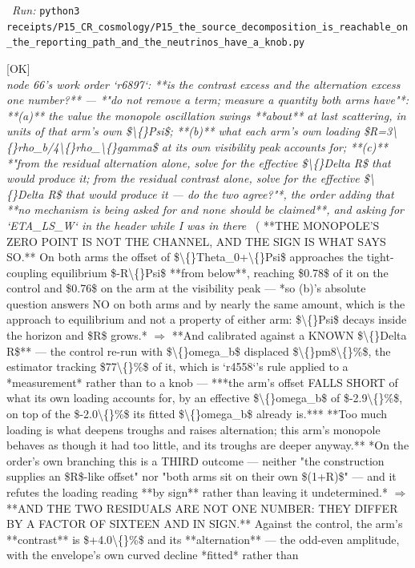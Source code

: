 \begin{description}
\ \emph{Run:} \texttt{python3 receipts/P15\_CR\_cosmology/P15\_the\_source\_decomposition\_is\_reachable\_on\_the\_reporting\_path\_and\_the\_neutrinos\_have\_a\_knob.py}
\item[\rcptlabel{P15_the_monopole_zero_point_is_not_the_channel_and_the_two_residuals_point_opposite_ways}{P15R177}\textbf{P15R177}\quad\texttt{P15\_the\_monopole\_zero\_point\_is\_not\_the\_channel\_and\_the\_two\_residuals\_point\_opposite\_ways}]\hfill\textsf{[OK]}\\
\textit{node 66's work order `r6897`: **is the contrast excess and the alternation excess one number?** --- *"do not remove a term; measure a quantity both arms have"*: **(a)** the value the monopole oscillation swings **about** at last scattering, in units of that arm's own \$\textbackslash\{\}Psi\$; **(b)** what each arm's own loading \$R=3\textbackslash\{\}rho\_b/4\textbackslash\{\}rho\_\textbackslash\{\}gamma\$ at its own visibility peak accounts for; **(c)** *"from the residual alternation alone, solve for the effective \$\textbackslash\{\}Delta R\$ that would produce it; from the residual contrast alone, solve for the effective \$\textbackslash\{\}Delta R\$ that would produce it --- do the two agree?"*, the order adding that **no mechanism is being asked for and none should be claimed**, and asking for `ETA\_LS\_W` in the header while I was in there} \ ( **THE MONOPOLE'S ZERO POINT IS NOT THE CHANNEL, AND THE SIGN IS WHAT SAYS SO.** On both arms the offset of \$\textbackslash\{\}Theta\_0+\textbackslash\{\}Psi\$ approaches the tight-coupling equilibrium \$-R\textbackslash\{\}Psi\$ **from below**, reaching \$0.78\$ of it on the control and \$0.76\$ on the arm at the visibility peak --- *so (b)'s absolute question answers NO on both arms and by nearly the same amount, which is the approach to equilibrium and not a property of either arm: \$\textbackslash\{\}Psi\$ decays inside the horizon and \$R\$ grows.* \ensuremath{\Rightarrow} **And calibrated against a KNOWN \$\textbackslash\{\}Delta R\$** --- the control re-run with \$\textbackslash\{\}omega\_b\$ displaced \$\textbackslash\{\}pm8\textbackslash\{\}\%\$, the estimator tracking \$77\textbackslash\{\}\%\$ of it, which is `r4558`'s rule applied to a *measurement* rather than to a knob --- ***the arm's offset FALLS SHORT of what its own loading accounts for, by an effective \$\textbackslash\{\}omega\_b\$ of \$-2.9\textbackslash\{\}\%\$, on top of the \$-2.0\textbackslash\{\}\%\$ its fitted \$\textbackslash\{\}omega\_b\$ already is.*** **Too much loading is what deepens troughs and raises alternation; this arm's monopole behaves as though it had too little, and its troughs are deeper anyway.**  *On the order's own branching this is a THIRD outcome --- neither "the construction supplies an \$R\$-like offset" nor "both arms sit on their own \$(1+R)\$" --- and it refutes the loading reading **by sign** rather than leaving it undetermined.* \ensuremath{\Rightarrow}  **AND THE TWO RESIDUALS ARE NOT ONE NUMBER: THEY DIFFER BY A FACTOR OF SIXTEEN AND IN SIGN.** Against the control, the arm's **contrast** is \$+4.0\textbackslash\{\}\%\$ and its **alternation** --- the odd-even amplitude, with the envelope's own curved decline *fitted* rather than 
\end{description}
